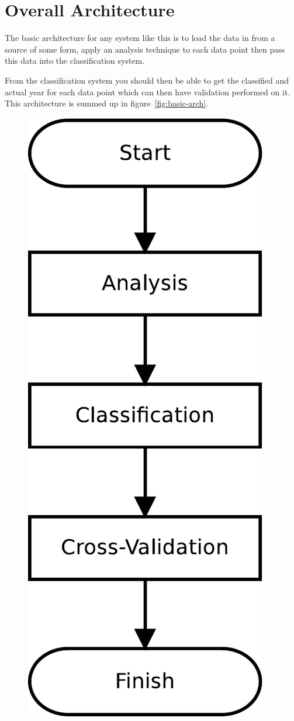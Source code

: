 \section{Overall Architecture}
The basic architecture for any system like this is to load the data in from a source of some form,
apply an analysis technique to each data point then pass this data into the classification system.

From the classification system you should then be able to get the classified and actual year for
each data point which can then have validation performed on it. This architecture is summed up in
figure~\ref{fig:basic-arch}.

\begin{figure}[h]
\includegraphics[width=\linewidth]{img/basic-arch}

\end{figure}
